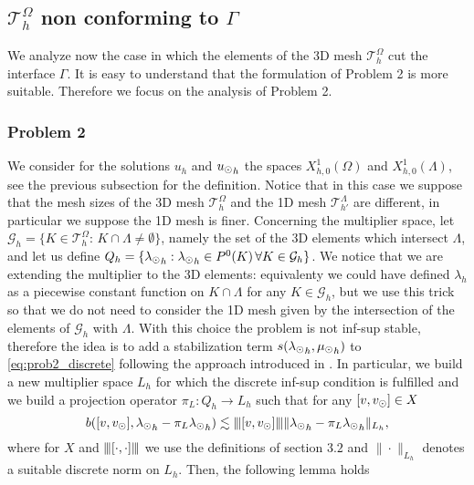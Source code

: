 \def\patch{\omega _j}
\subsection{$\mathcal{T}^{\Omega}_h$ non conforming to $\Gamma$}
We analyze now the case in which the elements of the 3D mesh $\mathcal{T}^{\Omega}_h$ cut the interface $\Gamma$. It is easy to understand that the formulation of Problem 2 is more suitable. 
Therefore we focus on the analysis of Problem 2.

\subsubsection{Problem 2} We consider for the solutions $u_h$ and ${u_{\odot}}_h$ the spaces $X_{h,0}^1(\Omega)$ and $X_{h,0}^1(\Lambda)$, see the previous subsection for the definition. Notice that in this case we suppose that the mesh sizes of the 3D mesh $\mathcal{T}^{\Omega}_h$ and the 1D mesh $\mathcal{T}^{\Lambda}_{h'}$ are different, in particular we suppose the 1D mesh is finer. Concerning the multiplier space, let $\mathcal{G}_h = \{K \in \mathcal{T}^{\Omega}_h: \, K\cap \Lambda \neq \emptyset\}$, namely the set of the 3D elements which intersect $\Lambda$, and let us define $Q_h=\{{\lambda_{\odot}}_h : {\lambda_{\odot}}_h \in P^0(K) \, \forall K \in \mathcal{G}_h\}$. We notice that we are extending the multiplier to the 3D elements: equivalenty we could have defined $\lambda_h$ as a piecewise constant function on $K\cap \Lambda$ for any $K \in \mathcal{G}_h$, but we use this trick so that we do not need to consider the 1D mesh given by the intersection of the elements of $\mathcal{G}_h$ with $\Lambda$. With this choice the problem is not inf-sup stable, therefore the idea is to add a stabilization term $s({\lambda_{\odot}}_h, {\mu_{\odot}}_h)$ to \eqref{eq:prob2_discrete} following the approach introduced in \cite{burman2014}. In particular, we build a new multiplier space $L_h$ for which the discrete inf-sup condition is fulfilled and we build a projection operator $\pi_L: Q_h \rightarrow L_h$ such that for any $[v, v_{\odot}] \in X $
\begin{equation}\label{condition_pi_L}
b([v, \vd], {\ld}_h - \pi_L {\ld}_h) \lesssim \vertiii{[v,\vd]}\|{\ld}_h - \pi_L {\ld}_h\|_{L_h},
\end{equation}
where for $X$ and ${\left\vert\kern-0.25ex\left\vert\kern-0.25ex\left\vert [\cdot, \cdot] \right\vert\kern-0.25ex\right\vert\kern-0.25ex\right\vert}$ we use the definitions of section $3.2$ and $\|\cdot \|_{L_h}$ denotes a suitable discrete norm on $L_h$. Then, the following lemma holds
